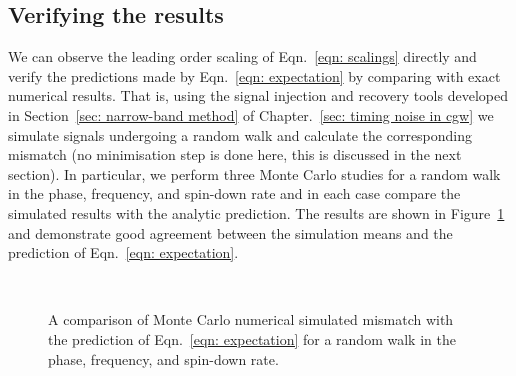 \documentclass[../full_thesis/full_thesis.tex]{subfiles}
\begin{document}

\subsection{Verifying the results}

We can observe the leading order scaling of Eqn.~\eqref{eqn: scalings}
directly and verify the predictions made by Eqn.~\eqref{eqn: expectation} by
comparing with exact numerical results. That is, using the signal injection and
recovery tools developed in Section~\ref{sec: narrow-band method} of
Chapter.~\ref{sec: timing noise in cgw} we simulate signals undergoing a random
walk and calculate the corresponding mismatch (no minimisation step is done
here, this is discussed in the next section). In particular, we perform three
Monte Carlo studies for a random walk in the phase, frequency, and spin-down
rate and in each case compare the simulated results with the analytic
prediction. The results are shown in Figure~\ref{fig: rw I} and demonstrate good
agreement between the simulation means and the prediction of Eqn.~\eqref{eqn:
expectation}.

\begin{figure}[ht]
\centering
{}
\\ 
\caption{A comparison of Monte Carlo numerical simulated mismatch with the prediction
of Eqn.~\eqref{eqn: expectation} for a random walk in the phase, frequency,
and spin-down rate.}
\label{fig: rw I}
\end{figure}
\end{document}

